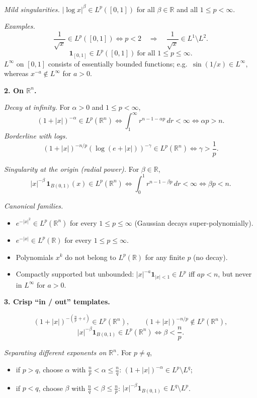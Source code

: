\begin{problem}[CP-III-0010]
	\medskip
	\emph{Mild singularities.}
	$|\log x|^\beta\in L^p([0,1])$ for all $\beta\in\mathbb{R}$ and all $1\le p<\infty$.

	\medskip
	\emph{Examples.}
	\[
	\frac{1}{\sqrt{x}}\in L^p([0,1]) \iff p<2
	\quad\Rightarrow\quad
	\frac{1}{\sqrt{x}}\in L^1\setminus L^2.
	\]
	\[
	\mathbf 1_{[0,1]}\in L^p([0,1]) \ \text{for all } 1\le p\le\infty.
	\]
	$L^\infty$ on $[0,1]$ consists of essentially bounded functions; e.g.\ $\sin(1/x)\in L^\infty$,
	whereas $x^{-a}\notin L^\infty$ for $a>0$.

	\bigskip
	\textbf{2. On $\mathbb{R}^n$.}

	\medskip
	\emph{Decay at infinity.}
	For $\alpha>0$ and $1\le p<\infty$,
	\[
	(1+|x|)^{-\alpha} \in L^p(\mathbb{R}^n)
	\iff \int_1^\infty r^{n-1-\alpha p}\,dr<\infty
	\iff \alpha p>n.
	\]
	\emph{Borderline with logs.}
	\[
	(1+|x|)^{-n/p}\!\left(\log(e+|x|)\right)^{-\gamma}\in L^p(\mathbb{R}^n)
	\iff \gamma>\frac1p.
	\]

	\medskip
	\emph{Singularity at the origin (radial power).}
	For $\beta\in\mathbb{R}$,
	\[
	|x|^{-\beta}\,\mathbf 1_{B(0,1)}(x)\in L^p(\mathbb{R}^n)
	\iff \int_0^1 r^{n-1-\beta p}\,dr<\infty
	\iff \beta p<n.
	\]

	\medskip
	\emph{Canonical families.}
	\begin{itemize}
		\item $e^{-|x|^2}\in L^p(\mathbb{R}^n)$ for every $1\le p\le\infty$ (Gaussian decays super-polynomially).
		\item $e^{-|x|}\in L^p(\mathbb{R})$ for every $1\le p\le\infty$.
		\item Polynomials $x^k$ do not belong to $L^p(\mathbb{R})$ for any finite $p$ (no decay).
		\item Compactly supported but unbounded:
		$|x|^{-a}\mathbf 1_{|x|<1}\in L^p$ iff $ap<n$, but never in $L^\infty$ for $a>0$.
	\end{itemize}

	\bigskip
	\textbf{3. Crisp ``in / out'' templates.}

	\medskip
	\[
	(1+|x|)^{-(\frac{n}{p}+\varepsilon)} \in L^p(\mathbb{R}^n),\qquad
	(1+|x|)^{-n/p} \notin L^p(\mathbb{R}^n),
	\]
	\[
	|x|^{-\beta}\mathbf 1_{B(0,1)} \in L^p(\mathbb{R}^n)\iff \beta<\frac{n}{p}.
	\]

	\medskip
	\emph{Separating different exponents on $\mathbb{R}^n$.}
	For $p\neq q$,
	\begin{itemize}
		\item if $p>q$, choose $\alpha$ with $\tfrac{n}{p}<\alpha\le \tfrac{n}{q}$:
		$(1+|x|)^{-\alpha}\in L^p\setminus L^q$;
		\item if $p<q$, choose $\beta$ with $\tfrac{n}{q}<\beta\le \tfrac{n}{p}$:
		$|x|^{-\beta}\mathbf 1_{B(0,1)}\in L^q\setminus L^p$.
	\end{itemize}


\end{problem}
